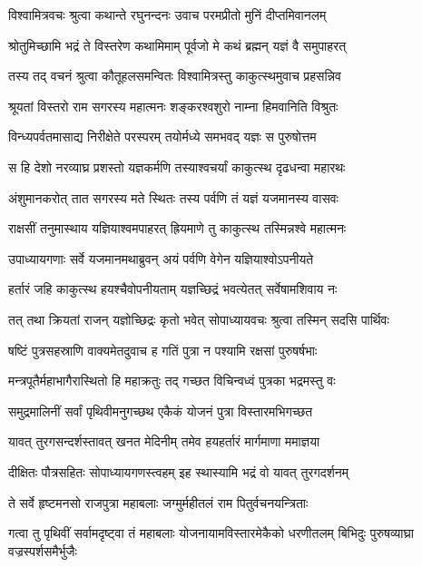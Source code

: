 
\twolineshloka
{विश्वामित्रवचः श्रुत्वा कथान्ते रघुनन्दनः}
{उवाच परमप्रीतो मुनिं दीप्तमिवानलम्} %

\twolineshloka
{श्रोतुमिच्छामि भद्रं ते विस्तरेण कथामिमाम्}
{पूर्वजो मे कथं ब्रह्मन् यज्ञं वै समुपाहरत्} %

\twolineshloka
{तस्य तद् वचनं श्रुत्वा कौतूहलसमन्वितः}
{विश्वामित्रस्तु काकुत्स्थमुवाच प्रहसन्निव} %

\twolineshloka
{श्रूयतां विस्तरो राम सगरस्य महात्मनः}
{शङ्करश्वशुरो नाम्ना हिमवानिति विश्रुतः} %

\twolineshloka
{विन्ध्यपर्वतमासाद्य निरीक्षेते परस्परम्}
{तयोर्मध्ये समभवद् यज्ञः स पुरुषोत्तम} %

\twolineshloka
{स हि देशो नरव्याघ्र प्रशस्तो यज्ञकर्मणि}
{तस्याश्वचर्यां काकुत्स्थ दृढधन्वा महारथः} %

\twolineshloka
{अंशुमानकरोत् तात सगरस्य मते स्थितः}
{तस्य पर्वणि तं यज्ञं यजमानस्य वासवः} %

\twolineshloka
{राक्षसीं तनुमास्थाय यज्ञियाश्वमपाहरत्}
{ह्रियमाणे तु काकुत्स्थ तस्मिन्नश्वे महात्मनः} %

\twolineshloka
{उपाध्यायगणाः सर्वे यजमानमथाब्रुवन्}
{अयं पर्वणि वेगेन यज्ञियाश्वोऽपनीयते} %

\twolineshloka
{हर्तारं जहि काकुत्स्थ हयश्चैवोपनीयताम्}
{यज्ञच्छिद्रं भवत्येतत् सर्वेषामशिवाय नः} %

\twolineshloka
{तत् तथा क्रियतां राजन् यज्ञोच्छिद्रः कृतो भवेत्}
{सोपाध्यायवचः श्रुत्वा तस्मिन् सदसि पार्थिवः} %

\twolineshloka
{षष्टिं पुत्रसहस्राणि वाक्यमेतदुवाच ह}
{गतिं पुत्रा न पश्यामि रक्षसां पुरुषर्षभाः} %

\twolineshloka
{मन्त्रपूतैर्महाभागैरास्थितो हि महाक्रतुः}
{तद् गच्छत विचिन्वध्वं पुत्रका भद्रमस्तु वः} %

\twolineshloka
{समुद्रमालिनीं सर्वां पृथिवीमनुगच्छथ}
{एकैकं योजनं पुत्रा विस्तारमभिगच्छत} %

\twolineshloka
{यावत् तुरगसन्दर्शस्तावत् खनत मेदिनीम्}
{तमेव हयहर्तारं मार्गमाणा ममाज्ञया} %

\twolineshloka
{दीक्षितः पौत्रसहितः सोपाध्यायगणस्त्वहम्}
{इह स्थास्यामि भद्रं वो यावत् तुरगदर्शनम्} %

\twolineshloka
{ते सर्वे हृष्टमनसो राजपुत्रा महाबलाः}
{जग्मुर्महीतलं राम पितुर्वचनयन्त्रिताः} %

\threelineshloka
{गत्वा तु पृथिवीं सर्वामदृष्ट्वा तं महाबलाः}
{योजनायामविस्तारमेकैको धरणीतलम्}
{बिभिदुः पुरुषव्याघ्रा वज्रस्पर्शसमैर्भुजैः} %

